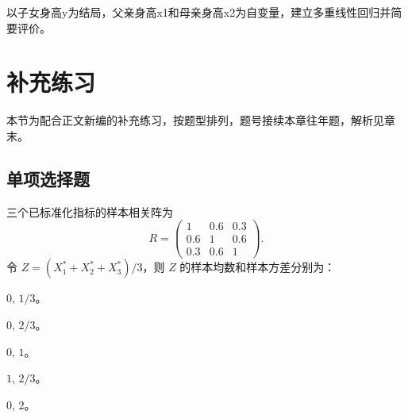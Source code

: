 \par\addvspace{6pt}\noindent\begin{minipage}{\linewidth}


以子女身高y为结局，父亲身高x1和母亲身高x2为自变量，建立多重线性回归并简要评价。



\end{minipage}\par\vspace{4pt}



\clearpage\section{补充练习}

本节为配合正文新编的补充练习，按题型排列，题号接续本章往年题，解析见章末。

\subsection{单项选择题}

\par\addvspace{6pt}\noindent\begin{minipage}{\linewidth}


三个已标准化指标的样本相关阵为 \[R=\begin{pmatrix}1&0.6&0.3\\0.6&1&0.6\\0.3&0.6&1\end{pmatrix}.\] 令 \(Z=(X_1^*+X_2^*+X_3^*)/3\)，则 \(Z\) 的样本均数和样本方差分别为：


\begin{choices}

\item \(0,\,1/3\)。

\item \(0,\,2/3\)。

\item \(0,\,1\)。

\item \(1,\,2/3\)。

\item \(0,\,2\)。

\end{choices}

\end{minipage}\par\vspace{4pt}

